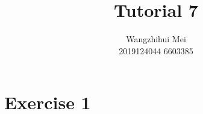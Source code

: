 \documentclass[12pt]{article}%
\begin{document}
\title{Tutorial 7} 
\author{Wangzhihui Mei \\ 2019124044 6603385}
\date{}
\maketitle

\section*{Exercise 1}
\end{document}
